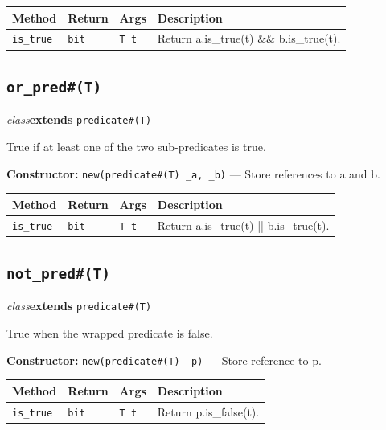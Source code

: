 \documentclass[11pt,letterpaper]{report}
\begin{document}
\begin{xltabular}{\linewidth}{>{\small}p{1.35in} >{\small}p{1.25in} >{\small}p{0.95in} >{\small}X}
\toprule
\textbf{Method} & \textbf{Return} & \textbf{Args} & \textbf{Description} \\
\midrule
\endhead
\bottomrule
\endfoot
\texttt{is\_true} & \texttt{bit} & \texttt{T t} & Return a.is\_true(t) \&\& b.is\_true(t). \\
\end{xltabular}

\subsection*{\texttt{or\_pred\#(T)}}
\noindent\small\textit{class}\quad \textbf{extends} \texttt{predicate\#(T)}\par

True if at least one of the two sub-predicates is true.

\noindent\textbf{Constructor:} \texttt{new(predicate\#(T) \_a, \_b)} --- Store references to a and b.

\begin{xltabular}{\linewidth}{>{\small}p{1.35in} >{\small}p{1.25in} >{\small}p{0.95in} >{\small}X}
\toprule
\textbf{Method} & \textbf{Return} & \textbf{Args} & \textbf{Description} \\
\midrule
\endhead
\bottomrule
\endfoot
\texttt{is\_true} & \texttt{bit} & \texttt{T t} & Return a.is\_true(t) || b.is\_true(t). \\
\end{xltabular}

\subsection*{\texttt{not\_pred\#(T)}}
\noindent\small\textit{class}\quad \textbf{extends} \texttt{predicate\#(T)}\par

True when the wrapped predicate is false.

\noindent\textbf{Constructor:} \texttt{new(predicate\#(T) \_p)} --- Store reference to p.

\begin{xltabular}{\linewidth}{>{\small}p{1.35in} >{\small}p{1.25in} >{\small}p{0.95in} >{\small}X}
\toprule
\textbf{Method} & \textbf{Return} & \textbf{Args} & \textbf{Description} \\
\midrule
\endhead
\bottomrule
\endfoot
\texttt{is\_true} & \texttt{bit} & \texttt{T t} & Return p.is\_false(t). \\
\end{xltabular}
\end{document}
